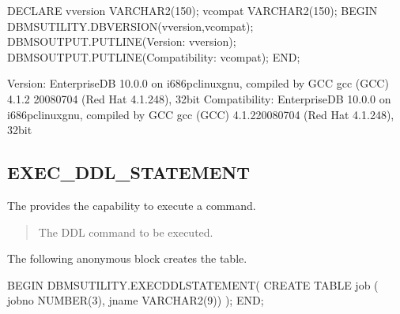 \documentclass[letterpaper,10pt,english,openany,oneside]{sphinxmanual}
\begin{document}
%
\begin{sphinxVerbatim}[commandchars=\\\{\}]
DECLARE
    v\PYGZus{}version       VARCHAR2(150);
    v\PYGZus{}compat        VARCHAR2(150);
BEGIN
    DBMS\PYGZus{}UTILITY.DB\PYGZus{}VERSION(v\PYGZus{}version,v\PYGZus{}compat);
    DBMS\PYGZus{}OUTPUT.PUT\PYGZus{}LINE(\PYGZsq{}Version: \PYGZsq{}       \textbar{}\textbar{} v\PYGZus{}version);
    DBMS\PYGZus{}OUTPUT.PUT\PYGZus{}LINE(\PYGZsq{}Compatibility: \PYGZsq{} \textbar{}\textbar{} v\PYGZus{}compat);
END;

Version: EnterpriseDB 10.0.0 on i686\PYGZhy{}pc\PYGZhy{}linux\PYGZhy{}gnu, compiled by GCC gcc (GCC) 4.1.2 20080704 (Red Hat 4.1.2\PYGZhy{}48), 32\PYGZhy{}bit
Compatibility: EnterpriseDB 10.0.0 on i686\PYGZhy{}pc\PYGZhy{}linux\PYGZhy{}gnu, compiled by GCC gcc (GCC) 4.1.220080704 (Red Hat 4.1.2\PYGZhy{}48), 32\PYGZhy{}bit
\end{sphinxVerbatim}

\newpage


\subsection{EXEC\_DDL\_STATEMENT}
\label{\detokenize{dbms_utility:exec-ddl-statement}}
The  provides the capability to execute a 
command.
\begin{quote}

\end{quote}


\begin{quote}

The DDL command to be executed.
\end{quote}


The following anonymous block creates the  table.

%
\begin{sphinxVerbatim}[commandchars=\\\{\}]
BEGIN
    DBMS\PYGZus{}UTILITY.EXEC\PYGZus{}DDL\PYGZus{}STATEMENT(
        \PYGZsq{}CREATE TABLE job (\PYGZsq{} \textbar{}\textbar{}
          \PYGZsq{}jobno NUMBER(3),\PYGZsq{} \textbar{}\textbar{}
          \PYGZsq{}jname VARCHAR2(9))\PYGZsq{}
    );
END;
\end{sphinxVerbatim}
\end{document}
